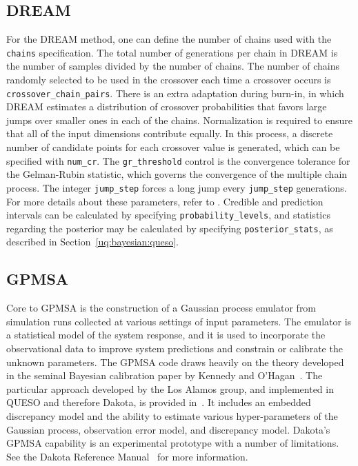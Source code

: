 \subsection{DREAM}
For the DREAM method, one can define the number of chains used with the
\texttt{chains} specification.  The total number of generations per chain in
DREAM is the number of samples divided by the number of chains.
The number of chains randomly selected to be used in the crossover
each time a crossover occurs is \texttt{crossover\_chain\_pairs}.
There is an extra adaptation during burn-in, in which DREAM estimates a
distribution of crossover probabilities that favors large jumps over
smaller ones in each of the chains.
Normalization is required to ensure that all of the input dimensions contribute
equally.  In this process, a discrete number of candidate points for
each crossover value is generated, which can be specified with \texttt{num\_cr}.
The \texttt{gr\_threshold} control is the convergence tolerance for the Gelman-Rubin
statistic, which governs the convergence of the multiple chain
process.  The integer \texttt{jump\_step} forces a long jump every 
\texttt{jump\_step} generations.
For more details about these parameters, refer to \cite{Vrugt}. 
Credible and prediction intervals can be calculated by specifying
\texttt{probability\_levels}, and statistics regarding the posterior may be
calculated by specifying \texttt{posterior\_stats}, as described in 
Section~\ref{uq:bayesian:queso}. 

\subsection{GPMSA}
Core to GPMSA is the construction of a Gaussian process emulator from
simulation runs collected at various settings of input parameters. The
emulator is a statistical model of the system response, and it is used
to incorporate the observational data to improve system predictions
and constrain or calibrate the unknown parameters. The GPMSA code
draws heavily on the theory developed in the seminal Bayesian
calibration paper by Kennedy and O'Hagan~\cite{Kenn01}. The particular
approach developed by the Los Alamos group, and implemented in QUESO
and therefore Dakota, is provided in~\cite{Hig08}.  It includes an
embedded discrepancy model and the ability to estimate various
hyper-parameters of the Gaussian process, observation error model, and
discrepancy model.  Dakota's GPMSA capability is an experimental
prototype with a number of limitations.  See the Dakota Reference
Manual~\cite{RefMan} for more information.

